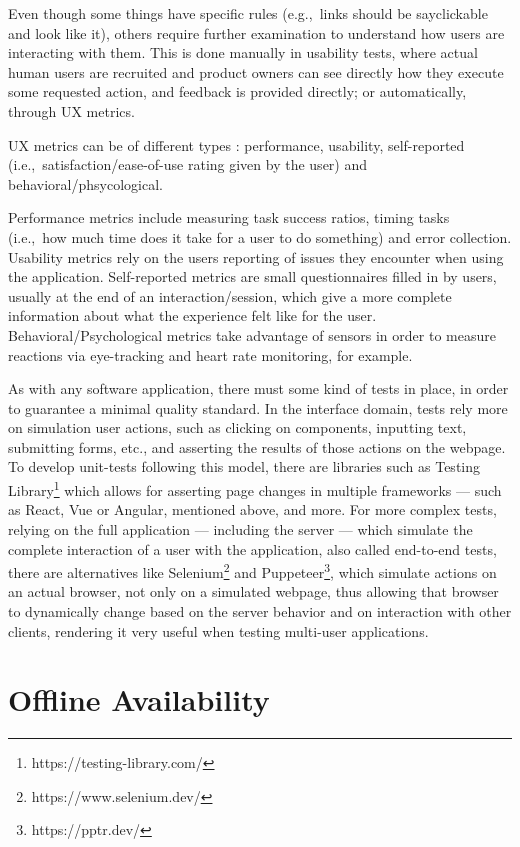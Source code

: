 Even though some things have specific rules (e.g.,\ links should be say{clickable} and look like it), others require further examination to understand how users are interacting with them. This is done manually in usability tests, where actual human users are recruited and product owners can see directly how they execute some requested action, and feedback is provided directly; or automatically, through UX metrics.

UX metrics can be of different types \cite{measuring-user-experience-tullis}: performance, usability, self-reported (i.e.,\ satisfaction/ease-of-use rating given by the user) and behavioral/phsycological.

Performance metrics include measuring task success ratios, timing tasks (i.e.,\ how much time does it take for a user to do something) and error collection. Usability metrics rely on the users reporting of issues they encounter when using the application. Self-reported metrics are small questionnaires filled in by users, usually at the end of an interaction/session, which give a more complete information about what the experience felt like for the user. Behavioral/Psychological metrics take advantage of sensors in order to measure reactions via eye-tracking and heart rate monitoring, for example.

As with any software application, there must some kind of tests in place, in order to guarantee a minimal quality standard. In the interface domain, tests rely more on simulation user actions, such as clicking on components, inputting text, submitting forms, etc., and asserting the results of those actions on the webpage. To develop unit-tests following this model, there are libraries such as Testing Library\footnote{https://testing-library.com/} which allows for asserting page changes in multiple frameworks --- such as React, Vue or Angular, mentioned above, and more. For more complex tests, relying on the full application --- including the server --- which simulate the complete interaction of a user with the application, also called end-to-end tests, there are alternatives like Selenium\footnote{https://www.selenium.dev/} and Puppeteer\footnote{https://pptr.dev/}, which simulate actions on an actual browser, not only on a simulated webpage, thus allowing that browser to dynamically change based on the server behavior and on interaction with other clients, rendering it very useful when testing multi-user applications.

\section{Offline Availability}\label{sec:offline-avail-sota}

